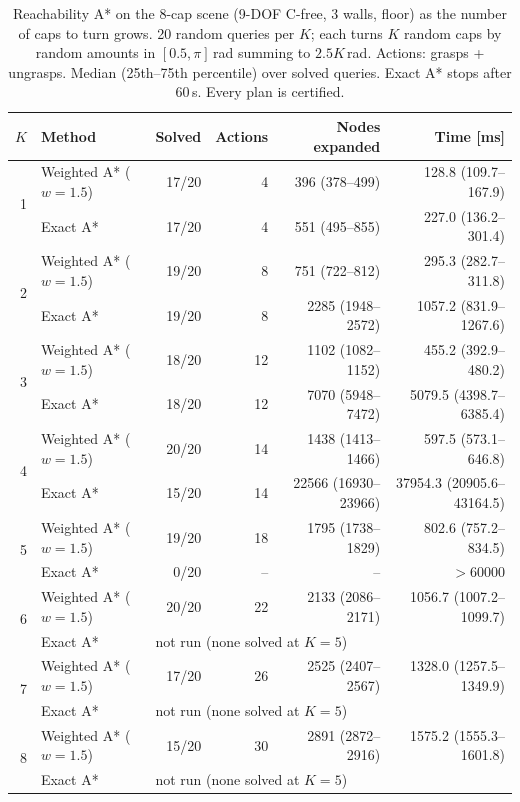 \begin{table}[t]
\centering
\caption{Reachability A* on the 8-cap scene (9-DOF C-free, 3 walls, floor) as the number of caps to
turn grows. 20 random queries per $K$; each turns $K$ random caps by random amounts in
$[0.5,\pi]$\,rad summing to $2.5K$\,rad. Actions: grasps + ungrasps. Median (25th--75th
percentile) over solved queries. Exact A* stops after 60\,s. Every plan is certified.}
\label{tab:cap_scaling}
\setlength{\tabcolsep}{3.5pt}
\begin{tabular}{@{}r l r r r r@{}}
\toprule
$K$ & Method & Solved & Actions & Nodes expanded & Time [ms]\\
\midrule
\multirow{2}{*}{1} & Weighted A* ($w=1.5$) & 17/20 & 4 & 396 (378--499) & 128.8 (109.7--167.9)\\
 & Exact A* & 17/20 & 4 & 551 (495--855) & 227.0 (136.2--301.4)\\
\midrule
\multirow{2}{*}{2} & Weighted A* ($w=1.5$) & 19/20 & 8 & 751 (722--812) & 295.3 (282.7--311.8)\\
 & Exact A* & 19/20 & 8 & 2285 (1948--2572) & 1057.2 (831.9--1267.6)\\
\midrule
\multirow{2}{*}{3} & Weighted A* ($w=1.5$) & 18/20 & 12 & 1102 (1082--1152) & 455.2 (392.9--480.2)\\
 & Exact A* & 18/20 & 12 & 7070 (5948--7472) & 5079.5 (4398.7--6385.4)\\
\midrule
\multirow{2}{*}{4} & Weighted A* ($w=1.5$) & 20/20 & 14 & 1438 (1413--1466) & 597.5 (573.1--646.8)\\
 & Exact A* & 15/20 & 14 & 22566 (16930--23966) & 37954.3 (20905.6--43164.5)\\
\midrule
\multirow{2}{*}{5} & Weighted A* ($w=1.5$) & 19/20 & 18 & 1795 (1738--1829) & 802.6 (757.2--834.5)\\
 & Exact A* & 0/20 & -- & -- & $>$60000\\
\midrule
\multirow{2}{*}{6} & Weighted A* ($w=1.5$) & 20/20 & 22 & 2133 (2086--2171) & 1056.7 (1007.2--1099.7)\\
 & Exact A* & \multicolumn{4}{l}{not run (none solved at $K=5$)}\\
\midrule
\multirow{2}{*}{7} & Weighted A* ($w=1.5$) & 17/20 & 26 & 2525 (2407--2567) & 1328.0 (1257.5--1349.9)\\
 & Exact A* & \multicolumn{4}{l}{not run (none solved at $K=5$)}\\
\midrule
\multirow{2}{*}{8} & Weighted A* ($w=1.5$) & 15/20 & 30 & 2891 (2872--2916) & 1575.2 (1555.3--1601.8)\\
 & Exact A* & \multicolumn{4}{l}{not run (none solved at $K=5$)}\\
\bottomrule
\end{tabular}
\end{table}
